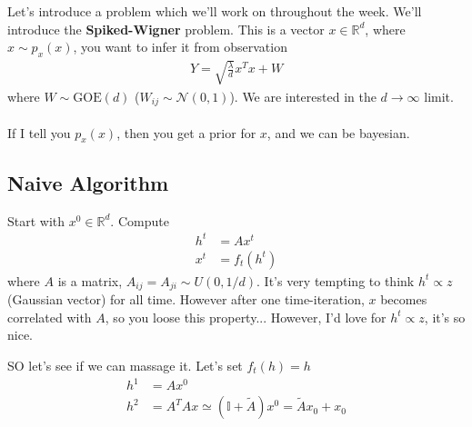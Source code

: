 

Let's introduce a problem which we'll work on throughout the week. We'll introduce the \textbf{Spiked-Wigner} problem. This is a vector $x \in \mathbb R^d$, where $x \sim p_x(x)$, you want to infer it from observation
\begin{align}
	Y = \sqrt{\frac{\lambda}{d}} x^T x  + W
\end{align}
where $W \sim \text{GOE}(d)$ ($W_{ij} \sim \mathcal N(0,1)$). We are interested in the $d \to \infty$ limit.\\
\\
If I tell you $p_x(x)$, then you get a prior for $x$, and we can be bayesian.

\subsection{Naive Algorithm}
Start with $x^0 \in \mathbb R^d$. Compute
\begin{align}
	h^t & = A x^t\\
	x^t & = f_t(h^t)
\end{align}
where $A$ is a matrix, $A_{ij} = A_{ji} \sim U(0,1/d)$. It's very tempting to think $h^t \propto z$ (Gaussian vector) for all time. However after one time-iteration, $x$ becomes correlated with $A$, so you loose this property... However, I'd love for $h^t \propto z$, it's so nice. 

SO let's see if we can massage it. Let's set $f_t(h) = h$
\begin{align}
	h^1 & = A x^0\\
	h^2 & = A^T A x \simeq (\mathbb I + \tilde A ) x^0 = \tilde A x_0 + x_0
\end{align}

